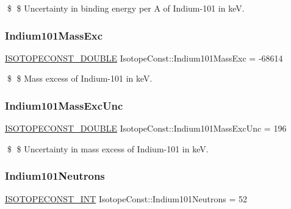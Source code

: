 \$ \$ Uncertainty in binding energy per A of Indium-\/101 in keV. \mbox{\label{group___isotope_const-_indium-_in101_gaec72baa783d8d4528842ba314f36b695}} 
\subsubsection{\texorpdfstring{Indium101\+Mass\+Exc}{Indium101MassExc}}
{\footnotesize\ttfamily \mbox{\hyperlink{group___isotope_const-_macros_ga8f45a7272ce02c0b4c65c44636ed719a}{I\+S\+O\+T\+O\+P\+E\+C\+O\+N\+S\+T\+\_\+\+D\+O\+U\+B\+LE}} Isotope\+Const\+::\+Indium101\+Mass\+Exc = -\/68614}

\$ \$ Mass excess of Indium-\/101 in keV. \mbox{\label{group___isotope_const-_indium-_in101_ga5d85ec32001776df302ef62f0e85699d}} 
\subsubsection{\texorpdfstring{Indium101\+Mass\+Exc\+Unc}{Indium101MassExcUnc}}
{\footnotesize\ttfamily \mbox{\hyperlink{group___isotope_const-_macros_ga8f45a7272ce02c0b4c65c44636ed719a}{I\+S\+O\+T\+O\+P\+E\+C\+O\+N\+S\+T\+\_\+\+D\+O\+U\+B\+LE}} Isotope\+Const\+::\+Indium101\+Mass\+Exc\+Unc = 196}

\$ \$ Uncertainty in mass excess of Indium-\/101 in keV. \mbox{\label{group___isotope_const-_indium-_in101_ga4665d89b58e9fccb3330190c4353ad5e}} 
\subsubsection{\texorpdfstring{Indium101\+Neutrons}{Indium101Neutrons}}
{\footnotesize\ttfamily \mbox{\hyperlink{group___isotope_const-_macros_ga5f18360b3e99483a35c32d789e62621c}{I\+S\+O\+T\+O\+P\+E\+C\+O\+N\+S\+T\+\_\+\+I\+NT}} Isotope\+Const\+::\+Indium101\+Neutrons = 52}

